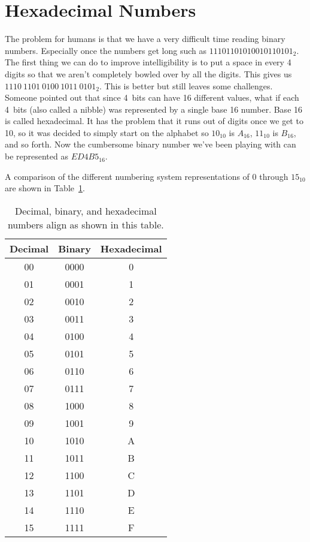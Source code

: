 \section{Hexadecimal Numbers}
\begin{sloppypar}
The problem for humans is that we have a very difficult time reading binary numbers. Especially once the
numbers get long such as $11101101010010110101_2$. The first thing we can do to improve intelligibility is to 
put a space in every 4 digits so that we aren't completely bowled over by all the digits. This gives us
$1110~1101~0100~1011~0101_2$. This is better but still leaves some challenges. Someone pointed out that since
4~bits can have 16 different values, what if each 4~bits (also called a nibble) was represented by a single
base 16 number. Base 16 is called hexadecimal. It has the problem that it runs out of digits once we get to 
10, so it was decided to simply start on the alphabet so $10_{10}$ is $A_{16}$, $11_{10}$ is $B_{16}$, and so forth. Now 
the cumbersome binary number we've been playing with can be represented as $ED4B5_{16}$. 
\end{sloppypar}

A comparison of the different numbering system representations of 0 through $15_{10}$ are shown in 
Table~\ref{table:numsystems}.

\begin{table}[!ht]
	\centering
	\begin{tabular}{c c c}
		\hline
		Decimal & Binary & Hexadecimal \\ 
		\hline
		00 & 0000 & 0 \\
		01 & 0001 & 1 \\
		02 & 0010 & 2 \\
		03 & 0011 & 3 \\
		04 & 0100 & 4 \\
		05 & 0101 & 5 \\
		06 & 0110 & 6 \\
		07 & 0111 & 7 \\
		08 & 1000 & 8 \\
		09 & 1001 & 9 \\
		10 & 1010 & A \\
		11 & 1011 & B \\
		12 & 1100 & C \\
		13 & 1101 & D \\
		14 & 1110 & E \\
		15 & 1111 & F \\
		\hline
	\end{tabular}
	\caption{Decimal, binary, and hexadecimal numbers align as shown in this table.}
	\label{table:numsystems}
\end{table}

